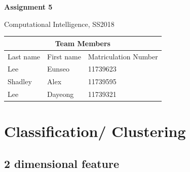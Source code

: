 \documentclass[a4paper]{article}
\begin{document}
	\begin{titlepage}
		\centering
		{\huge \bf Assignment 5\par}
		\vspace{1cm}
		{\Large Computational Intelligence, SS2018\par}
		\vspace{1cm}
		\begin{tabular}{|l|l|l|}
			\hline
			\multicolumn{3}{|c|}{\textbf{Team Members}}   \\ \hline
			Last name & First name & Matriculation Number \\ \hline
			Lee       & Eunseo     & 11739623             \\ \hline
			Shadley   & Alex       & 11739595             \\ \hline
			Lee       & Dayeong    & 11739321             \\ \hline
		\end{tabular}
	\end{titlepage}

	\section{Classiﬁcation/ Clustering}
	\subsection{2 dimensional feature}
\end{document}
